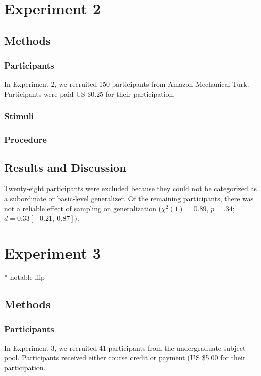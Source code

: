 \documentclass[man]{apa2}
\begin{document}
\section{Experiment 2}

\subsection{Methods}

\subsubsection{Participants} In Experiment 2, we recruited 150 participants from Amazon Mechanical Turk. Participants were paid US \$0.25 for their participation.
\subsubsection{Stimuli}



\subsubsection{Procedure}

\subsection{Results and Discussion}
Twenty-eight participants were excluded because they could not be categorized as a subordinate or basic-level generalizer. Of the remaining participants, there was not a reliable effect of sampling on generalization ($\chi^2(1) = 0.89$,  $p = .34$; $d = 0.33 [-0.21,\ 0.87]$).




\section{Experiment 3}
* notable flip
\subsection{Methods}

\subsubsection{Participants}  In Experiment 3, we recruited 41 participants from the undergraduate subject pool. Participants received either course credit or payment (US \$5.00 for their participation. 
\end{document}
